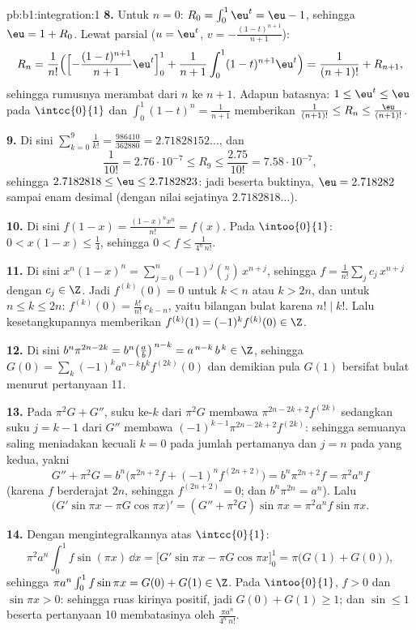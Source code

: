 \begin{solution}{pb:b1:integration:1}
\textbf{8.} Untuk $n = 0$: $R_0 = \int_0^1 \eu^t = \eu - 1$, sehingga $\eu =
1 + R_0$. Lewat parsial ($u = \eu^t$, $v = -\frac{(1-t)^{n+1}}{n+1}$):
\[
R_n = \frac{1}{n!}\Bigl(\Bigl[-\frac{(1-t)^{n+1}}{n+1}
\eu^t\Bigr]_0^1 + \frac{1}{n+1}\int_0^1 (1-t)^{n+1}\eu^t\Bigr)
= \frac{1}{(n+1)!} + R_{n+1} ,
\]
sehingga rumusnya merambat dari $n$ ke $n + 1$. Adapun batasnya: $1 \leq
\eu^t \leq \eu$ pada $\intcc{0}{1}$ dan $\int_0^1 (1-t)^n =
\frac{1}{n+1}$ memberikan $\frac{1}{(n+1)!} \leq R_n \leq
\frac{\eu}{(n+1)!}$.

\textbf{9.} Di sini $\sum_{k=0}^{9} \frac{1}{k!} = \frac{986410}{362880}
= 2.71828152\dots$, dan
\[
\frac{1}{10!} = 2.76\cdot10^{-7} \leq R_9 \leq
\frac{2.75}{10!} = 7.58\cdot10^{-7} ,
\]
sehingga $2.7182818 \leq \eu \leq 2.7182823$: jadi beserta buktinya, $\eu =
2.718282$ sampai enam desimal (dengan nilai sejatinya $2.7182818\dots$).

\textbf{10.} Di sini $f(1 - x) = \frac{(1-x)^n x^n}{n!} = f(x)$. Pada
$\intoo{0}{1}$: $0 < x(1-x) \leq \frac14$, sehingga $0 < f \leq
\frac{1}{4^n\,n!}$.

\textbf{11.} Di sini $x^n(1-x)^n = \sum_{j=0}^{n} (-1)^j\binom
nj\,x^{n+j}$, sehingga $f = \frac{1}{n!}\sum_j c_j\,x^{n+j}$ dengan
$c_j \in \Z$. Jadi $f^{(k)}(0) = 0$ untuk $k < n$ atau $k > 2n$,
dan untuk $n \leq k \leq 2n$: $f^{(k)}(0) = \frac{k!}{n!}\,
c_{k-n}$, yaitu bilangan bulat karena $n! \mid k!$. Lalu kesetangkupannya memberikan
$f^{(k)}(1) = (-1)^k f^{(k)}(0) \in \Z$.

\textbf{12.} Di sini $b^n \pi^{2n-2k} = b^n\bigl(\frac
ab\bigr)^{\,n-k} = a^{\,n-k}\,b^{\,k} \in \Z$, sehingga $G(0) =
\sum_k (-1)^k a^{n-k} b^k f^{(2k)}(0)$ dan demikian pula $G(1)$ bersifat
bulat menurut pertanyaan 11.

\textbf{13.} Pada $\pi^2 G + G''$, suku ke-$k$ dari $\pi^2 G$
membawa $\pi^{2n-2k+2}f^{(2k)}$ sedangkan suku $j = k - 1$ dari
$G''$ membawa $(-1)^{k-1}\pi^{2n-2k+2}f^{(2k)}$: sehingga semuanya
saling meniadakan kecuali $k = 0$ pada jumlah pertamanya dan $j = n$ pada
yang kedua, yakni
\[
G'' + \pi^2 G = b^n\bigl(\pi^{2n+2} f + (-1)^n f^{(2n+2)}\bigr)
= b^n \pi^{2n+2} f = \pi^2 a^n f
\]
(karena $f$ berderajat $2n$, sehingga $f^{(2n+2)} = 0$; dan $b^n\pi^{2n} =
a^n$). Lalu
\[
\bigl(G'\sin\pi x - \pi G\cos\pi x\bigr)'
= (G'' + \pi^2 G)\sin \pi x = \pi^2 a^n f\sin\pi x .
\]

\textbf{14.} Dengan mengintegralkannya atas $\intcc{0}{1}$:
\[
\pi^2 a^n \int_0^1 f\sin(\pi x)\,\dd x
= \bigl[G'\sin\pi x - \pi G\cos\pi x\bigr]_0^1
= \pi\bigl(G(1) + G(0)\bigr) ,
\]
sehingga $\pi a^n \int_0^1 f\sin\pi x = G(0) + G(1) \in \Z$. Pada
$\intoo{0}{1}$, $f > 0$ dan $\sin\pi x > 0$: sehingga ruas kirinya
positif, jadi $G(0) + G(1) \geq 1$; dan $\sin \leq 1$ beserta
pertanyaan 10 membatasinya oleh $\frac{\pi a^n}{4^n\,n!}$.


\end{solution}
